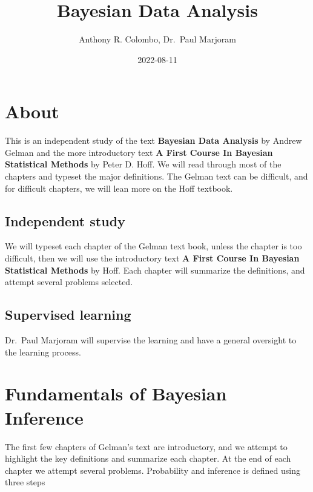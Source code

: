 \documentclass[
]{book}
\title{Bayesian Data Analysis}
\author{Anthony R. Colombo, Dr.~Paul Marjoram}
\date{2022-08-11}
\theoremstyle{definition}
\theoremstyle{definition}
\theoremstyle{definition}
\theoremstyle{definition}
\theoremstyle{remark}
\begin{document}
\maketitle

{
\setcounter{tocdepth}{1}
\tableofcontents
}
\hypertarget{about}{%
\chapter*{About}\label{about}}

This is an independent study of the text \textbf{Bayesian Data Analysis} by Andrew Gelman and the more introductory text \textbf{A First Course In Bayesian Statistical Methods} by Peter D. Hoff. We will read through most of the chapters and typeset the major definitions. The Gelman text can be difficult, and for difficult chapters, we will lean more on the Hoff textbook.

\hypertarget{independent-study}{%
\section*{Independent study}\label{independent-study}}

We will typeset each chapter of the Gelman text book, unless the chapter is too difficult, then we will use the introductory text \textbf{A First Course In Bayesian Statistical Methods} by Hoff. Each chapter will summarize the definitions, and attempt several problems selected.

\hypertarget{supervised-learning}{%
\section*{Supervised learning}\label{supervised-learning}}

Dr.~Paul Marjoram will supervise the learning and have a general oversight to the learning process.

\hypertarget{fundamentals-of-bayesian-inference}{%
\chapter{Fundamentals of Bayesian Inference}\label{fundamentals-of-bayesian-inference}}

The first few chapters of Gelman's text are introductory, and we attempt to highlight the key definitions and summarize each chapter. At the end of each chapter we attempt several problems. Probability and inference is defined using three steps
\end{document}
